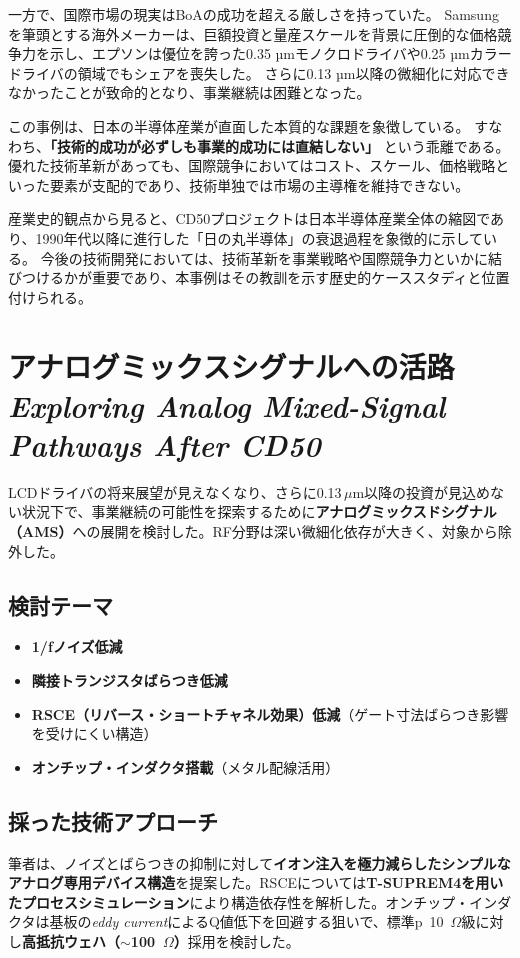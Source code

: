 \documentclass[conference]{IEEEtran}
\begin{document}
一方で、国際市場の現実はBoAの成功を超える厳しさを持っていた。  
Samsungを筆頭とする海外メーカーは、巨額投資と量産スケールを背景に圧倒的な価格競争力を示し、エプソンは優位を誇った0.35 µmモノクロドライバや0.25 µmカラードライバの領域でもシェアを喪失した。  
さらに0.13 µm以降の微細化に対応できなかったことが致命的となり、事業継続は困難となった。

この事例は、日本の半導体産業が直面した本質的な課題を象徴している。  
すなわち、\textbf{「技術的成功が必ずしも事業的成功には直結しない」} という乖離である。  
優れた技術革新があっても、国際競争においてはコスト、スケール、価格戦略といった要素が支配的であり、技術単独では市場の主導権を維持できない。  

産業史的観点から見ると、CD50プロジェクトは日本半導体産業全体の縮図であり、1990年代以降に進行した「日の丸半導体」の衰退過程を象徴的に示している。  
今後の技術開発においては、技術革新を事業戦略や国際競争力といかに結びつけるかが重要であり、本事例はその教訓を示す歴史的ケーススタディと位置付けられる。

\appendix
\section{アナログミックスシグナルへの活路\\\normalfont\itshape Exploring Analog Mixed-Signal Pathways After CD50}

LCDドライバの将来展望が見えなくなり、さらに0.13\,\(\mu\)m以降の投資が見込めない状況下で、事業継続の可能性を探索するために\textbf{アナログミックスドシグナル（AMS）}への展開を検討した。RF分野は深い微細化依存が大きく、対象から除外した。

\subsection*{検討テーマ}
\begin{itemize}
  \item \textbf{1/fノイズ低減}
  \item \textbf{隣接トランジスタばらつき低減}
  \item \textbf{RSCE（リバース・ショートチャネル効果）低減}（ゲート寸法ばらつき影響を受けにくい構造）
  \item \textbf{オンチップ・インダクタ搭載}（メタル配線活用）
\end{itemize}

\subsection*{採った技術アプローチ}
筆者は、ノイズとばらつきの抑制に対して\textbf{イオン注入を極力減らしたシンプルなアナログ専用デバイス構造}を提案した。RSCEについては\textbf{T-SUPREM4を用いたプロセスシミュレーション}により構造依存性を解析した。オンチップ・インダクタは基板の\textit{eddy current}によるQ値低下を回避する狙いで、標準p~10~\(\Omega\)級に対し\textbf{高抵抗ウェハ（\(\sim\)100~\(\Omega\)）}採用を検討した。
\end{document}
